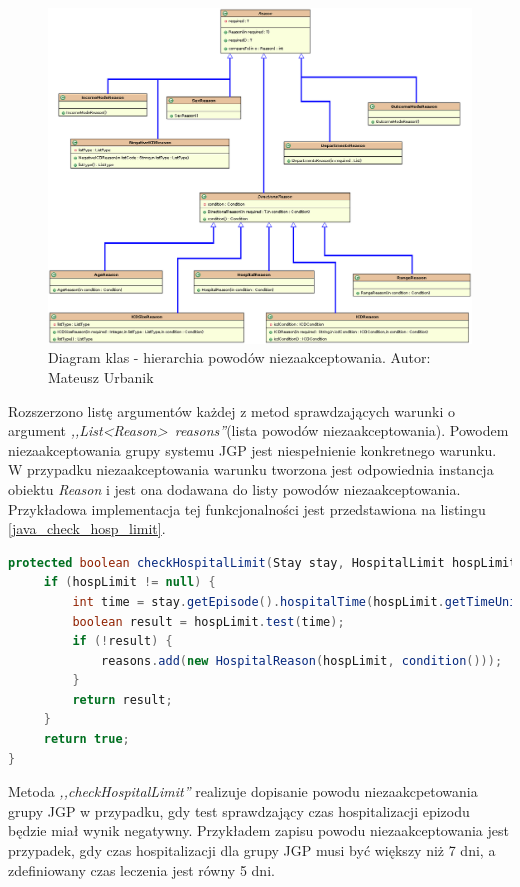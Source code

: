 \begin{figure}[!ht]
\centering
\includegraphics[scale=0.4]{images/reason-classes2}
\caption[Diagram aktywności]{Diagram klas - hierarchia powodów niezaakceptowania. Autor: Mateusz Urbanik}
\label{img:diagram_class_reason}
\end{figure}

\newpage
Rozszerzono listę argumentów każdej z metod sprawdzających warunki o argument \mbox{\textit{,,List<Reason> reasons''}}(lista powodów niezaakceptowania). Powodem niezaakceptowania grupy systemu JGP jest niespełnienie konkretnego warunku.
W przypadku niezaakceptowania warunku tworzona jest odpowiednia instancja obiektu \textit{Reason} i jest ona  dodawana do listy powodów niezaakceptowania. Przykładowa implementacja tej funkcjonalności jest przedstawiona na listingu \ref{java_check_hosp_limit}.

\begin{lstlisting}[language=Java,caption={Metoda sprawdzająca warunek na czas hospitalizacji. Autor: Mateusz Urbanik},label=java_check_hosp_limit]
protected boolean checkHospitalLimit(Stay stay, HospitalLimit hospLimit, List<Reason> reasons) {
     if (hospLimit != null) {
         int time = stay.getEpisode().hospitalTime(hospLimit.getTimeUnit());
         boolean result = hospLimit.test(time);
         if (!result) {
             reasons.add(new HospitalReason(hospLimit, condition()));
         }
         return result;
     }
     return true;
}
\end{lstlisting}

Metoda \textit{,,checkHospitalLimit''} realizuje dopisanie powodu niezaakcpetowania grupy JGP w przypadku, gdy test sprawdzający czas hospitalizacji epizodu będzie miał wynik negatywny. Przykładem zapisu powodu niezaakceptowania jest przypadek, gdy czas hospitalizacji dla grupy JGP musi być większy niż 7 dni, a zdefiniowany czas leczenia jest równy 5 dni.

